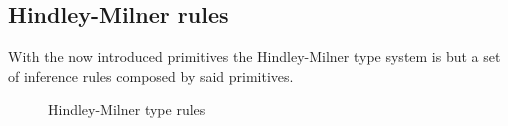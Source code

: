 \documentclass[11pt,oneside,a4paper]{report}
\begin{document}
\subsection{Hindley-Milner rules}
With the now introduced primitives the Hindley-Milner type system is but a set of inference rules composed by said primitives.
\begin{figure}[ht]
\begin{mdframed}
    \begin{prooftree}
    \end{prooftree}
    \endminipage
    \begin{prooftree}
    \end{prooftree}
    \endminipage\hfill\vspace{0.8cm}

    \begin{prooftree}
    \end{prooftree}
    \endminipage\hfill
    \begin{prooftree}
    \end{prooftree}
    \endminipage\hfill\vspace{0.8cm}

    \begin{prooftree}
    \end{prooftree}
    \endminipage\hfill
    \begin{prooftree}
    \end{prooftree}
    \endminipage
\end{mdframed}
\caption{Hindley-Milner type rules}
\label{fig:hmrules}
\end{figure}
\end{document}
